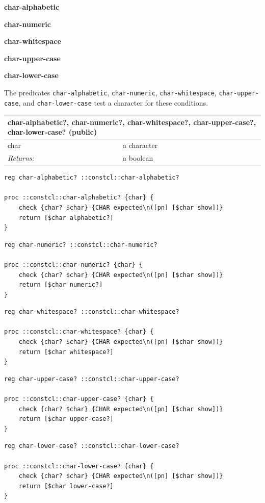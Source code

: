 \documentclass[twoside,9pt]{report}
\begin{document}
\textbf{char-alphabetic}


\textbf{char-numeric}


\textbf{char-whitespace}


\textbf{char-upper-case}


\textbf{char-lower-case}


The predicates \texttt{char-alphabetic}, \texttt{char-numeric}, \texttt{char-whitespace}, \texttt{char-upper-case}, and \texttt{char-lower-case} test a character for these conditions.

\begin{tabular}{ |l l| }
\hline
\multicolumn{2}{|l|}{char-alphabetic?, char-numeric?, char-whitespace?, char-upper-case?, char-lower-case? (public)} \\
\hline
char & a character \\
\textit{Returns:} & a boolean \\
\hline
\end{tabular}

\noindent\makebox[\linewidth]{\rule{\linewidth}{0.4pt}}
\begin{lstlisting}
reg char-alphabetic? ::constcl::char-alphabetic?
 
proc ::constcl::char-alphabetic? {char} {
    check {char? $char} {CHAR expected\n([pn] [$char show])}
    return [$char alphabetic?]
}
\end{lstlisting}
\noindent\makebox[\linewidth]{\rule{\linewidth}{0.4pt}}
\noindent\makebox[\linewidth]{\rule{\linewidth}{0.4pt}}
\begin{lstlisting}
reg char-numeric? ::constcl::char-numeric?
 
proc ::constcl::char-numeric? {char} {
    check {char? $char} {CHAR expected\n([pn] [$char show])}
    return [$char numeric?]
}
\end{lstlisting}
\noindent\makebox[\linewidth]{\rule{\linewidth}{0.4pt}}
\noindent\makebox[\linewidth]{\rule{\linewidth}{0.4pt}}
\begin{lstlisting}
reg char-whitespace? ::constcl::char-whitespace?
 
proc ::constcl::char-whitespace? {char} {
    check {char? $char} {CHAR expected\n([pn] [$char show])}
    return [$char whitespace?]
}
\end{lstlisting}
\noindent\makebox[\linewidth]{\rule{\linewidth}{0.4pt}}
\noindent\makebox[\linewidth]{\rule{\linewidth}{0.4pt}}
\begin{lstlisting}
reg char-upper-case? ::constcl::char-upper-case?
 
proc ::constcl::char-upper-case? {char} {
    check {char? $char} {CHAR expected\n([pn] [$char show])}
    return [$char upper-case?]
}
\end{lstlisting}
\noindent\makebox[\linewidth]{\rule{\linewidth}{0.4pt}}
\noindent\makebox[\linewidth]{\rule{\linewidth}{0.4pt}}
\begin{lstlisting}
reg char-lower-case? ::constcl::char-lower-case?
 
proc ::constcl::char-lower-case? {char} {
    check {char? $char} {CHAR expected\n([pn] [$char show])}
    return [$char lower-case?]
}
\end{lstlisting}
\noindent\makebox[\linewidth]{\rule{\linewidth}{0.4pt}}
\end{document}
